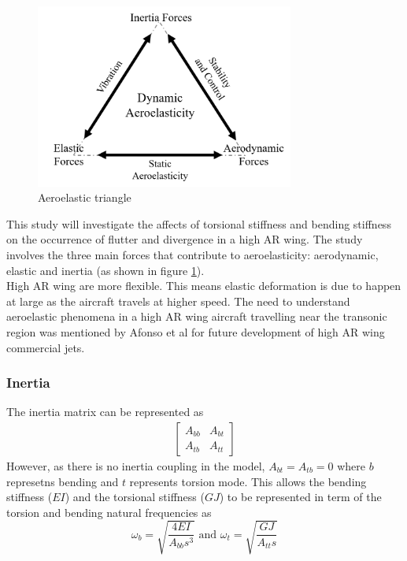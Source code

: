 \documentclass[11pt]{article}
\begin{document}
\begin{figure}
    \includegraphics[width=8.5cm]{figures/aero-tri.png}
    \caption{Aeroelastic triangle}
    \label{fig:aero-tri}
\end{figure} 

This study will investigate the affects of torsional stiffness and bending stiffness on the occurrence of flutter and divergence in a high AR wing. The study involves the three main forces that contribute to aeroelasticity: aerodynamic, elastic and inertia (as shown in figure \ref{fig:aero-tri}).\\

High AR wing are more flexible. This means elastic deformation is due to happen at large as the aircraft travels at higher speed. The need to understand aeroelastic phenomena in a high AR wing aircraft travelling near the transonic region was mentioned by Afonso et al \cite{Afonso2017AWings} for future development of high AR wing commercial jets.

\subsubsection{Inertia}
The inertia matrix can be represented as 
\begin{gather*}
    \begin{bmatrix}A_{bb} & A_{bt} \\ A_{tb} & A_{tt} \end{bmatrix}
\end{gather*}
However, as there is no inertia coupling in the model, $A_{bt} = A_{tb} = 0$ where $b$ represetns bending and $t$ represents torsion mode. This allows the bending stiffness ($EI$) and the torsional stiffness ($GJ$) to be represented in term of the torsion and bending natural frequencies as
\begin{equation}
    \omega_b = \sqrt{\frac{4EI}{A_{bb}s^3}} \text{ and } \omega_t = \sqrt{\frac{GJ}{A_{tt}s}}
\end{equation}
\end{document}
